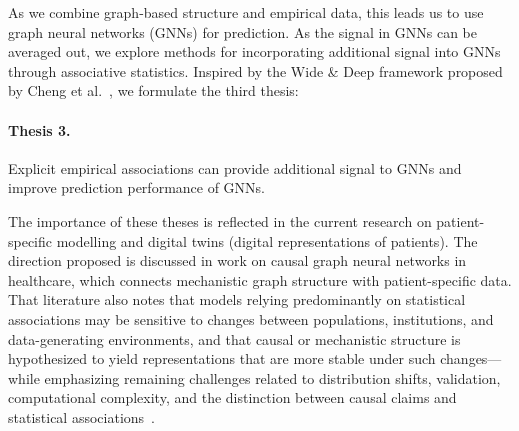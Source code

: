 \medskip

As we combine graph-based structure and empirical data, this leads us to use
graph neural networks (GNNs) for prediction.
As the signal in GNNs can be averaged out, we explore
methods for incorporating additional signal into GNNs through associative statistics.
Inspired by the Wide \& Deep framework proposed by Cheng et al.~\cite{cheng2016wide}, 
we formulate the third thesis:

\paragraph{Thesis 3.}
Explicit empirical associations can provide additional signal to GNNs and improve prediction performance of GNNs.

\medskip

The importance of these theses is reflected in the current research on
patient-specific modelling and digital twins (digital representations of patients).
The direction proposed is discussed in work on causal graph neural networks in healthcare,
which connects mechanistic graph structure with patient-specific data.
That literature also notes that models relying predominantly on statistical associations
may be sensitive to changes between populations, institutions, and data-generating
environments, and that causal or mechanistic structure is hypothesized to yield
representations that are more stable under such changes---while emphasizing remaining
challenges related to distribution shifts, validation, computational complexity, and
the distinction between causal claims and statistical
associations~\cite{mesinovic2025causal}.


